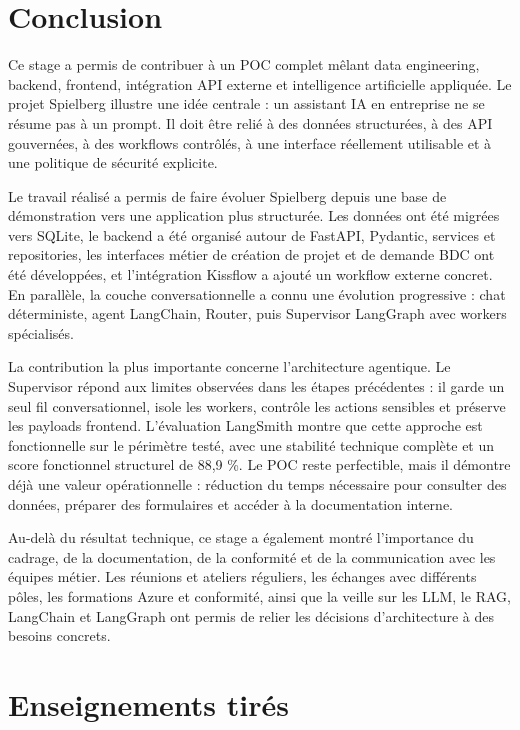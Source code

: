 \documentclass[a4paper,11pt,english,openany]{book}
\begin{document}
\section{Conclusion}

Ce stage a permis de contribuer à un POC complet mêlant data engineering, backend, frontend, intégration API externe et intelligence artificielle appliquée. Le projet Spielberg illustre une idée centrale : un assistant IA en entreprise ne se résume pas à un prompt. Il doit être relié à des données structurées, à des API gouvernées, à des workflows contrôlés, à une interface réellement utilisable et à une politique de sécurité explicite.

Le travail réalisé a permis de faire évoluer Spielberg depuis une base de démonstration vers une application plus structurée. Les données ont été migrées vers SQLite, le backend a été organisé autour de FastAPI, Pydantic, services et repositories, les interfaces métier de création de projet et de demande BDC ont été développées, et l'intégration Kissflow a ajouté un workflow externe concret. En parallèle, la couche conversationnelle a connu une évolution progressive : chat déterministe, agent LangChain, Router, puis Supervisor LangGraph avec workers spécialisés.

La contribution la plus importante concerne l'architecture agentique. Le Supervisor répond aux limites observées dans les étapes précédentes : il garde un seul fil conversationnel, isole les workers, contrôle les actions sensibles et préserve les payloads frontend. L'évaluation LangSmith montre que cette approche est fonctionnelle sur le périmètre testé, avec une stabilité technique complète et un score fonctionnel structurel de 88,9 \%. Le POC reste perfectible, mais il démontre déjà une valeur opérationnelle : réduction du temps nécessaire pour consulter des données, préparer des formulaires et accéder à la documentation interne.

Au-delà du résultat technique, ce stage a également montré l'importance du cadrage, de la documentation, de la conformité et de la communication avec les équipes métier. Les réunions et ateliers réguliers, les échanges avec différents pôles, les formations Azure et conformité, ainsi que la veille sur les LLM, le RAG, LangChain et LangGraph ont permis de relier les décisions d'architecture à des besoins concrets.

\section{Enseignements tirés}
\end{document}
